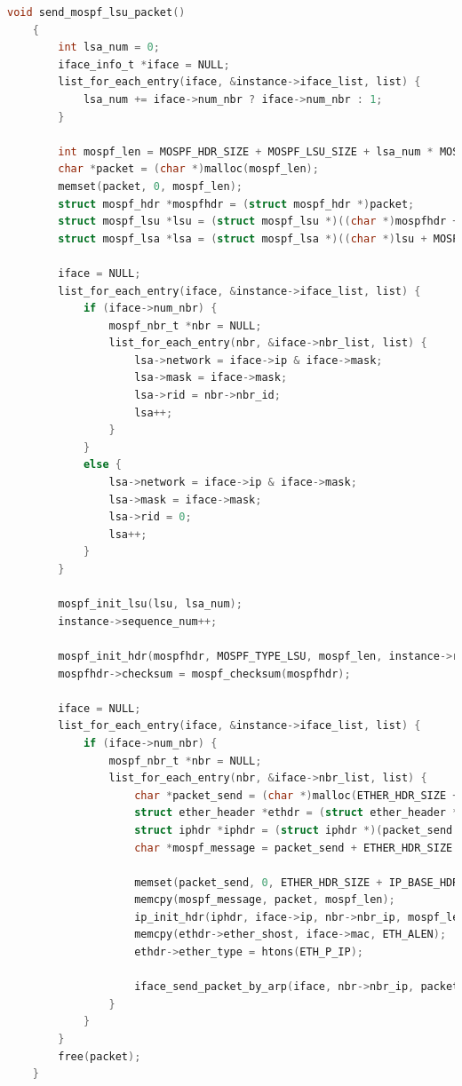 \documentclass[UTF8]{report}
\begin{document}
\begin{lstlisting}[language=C]
    void send_mospf_lsu_packet()
    {
        int lsa_num = 0;
        iface_info_t *iface = NULL;
        list_for_each_entry(iface, &instance->iface_list, list) {
            lsa_num += iface->num_nbr ? iface->num_nbr : 1;
        }
    
        int mospf_len = MOSPF_HDR_SIZE + MOSPF_LSU_SIZE + lsa_num * MOSPF_LSA_SIZE;
        char *packet = (char *)malloc(mospf_len);
        memset(packet, 0, mospf_len);
        struct mospf_hdr *mospfhdr = (struct mospf_hdr *)packet;
        struct mospf_lsu *lsu = (struct mospf_lsu *)((char *)mospfhdr + MOSPF_HDR_SIZE);
        struct mospf_lsa *lsa = (struct mospf_lsa *)((char *)lsu + MOSPF_LSU_SIZE);
    
        iface = NULL;
        list_for_each_entry(iface, &instance->iface_list, list) {
            if (iface->num_nbr) {
                mospf_nbr_t *nbr = NULL;
                list_for_each_entry(nbr, &iface->nbr_list, list) {
                    lsa->network = iface->ip & iface->mask;
                    lsa->mask = iface->mask;
                    lsa->rid = nbr->nbr_id;
                    lsa++;
                }
            }
            else {
                lsa->network = iface->ip & iface->mask;
                lsa->mask = iface->mask;
                lsa->rid = 0;
                lsa++;
            }
        }
    
        mospf_init_lsu(lsu, lsa_num);
        instance->sequence_num++;
    
        mospf_init_hdr(mospfhdr, MOSPF_TYPE_LSU, mospf_len, instance->router_id, instance->area_id);
        mospfhdr->checksum = mospf_checksum(mospfhdr);
    
        iface = NULL;
        list_for_each_entry(iface, &instance->iface_list, list) {
            if (iface->num_nbr) {
                mospf_nbr_t *nbr = NULL;
                list_for_each_entry(nbr, &iface->nbr_list, list) {
                    char *packet_send = (char *)malloc(ETHER_HDR_SIZE + IP_BASE_HDR_SIZE + mospf_len);
                    struct ether_header *ethdr = (struct ether_header *)packet_send;
                    struct iphdr *iphdr = (struct iphdr *)(packet_send + ETHER_HDR_SIZE);
                    char *mospf_message = packet_send + ETHER_HDR_SIZE + IP_BASE_HDR_SIZE;
    
                    memset(packet_send, 0, ETHER_HDR_SIZE + IP_BASE_HDR_SIZE + mospf_len);
                    memcpy(mospf_message, packet, mospf_len);
                    ip_init_hdr(iphdr, iface->ip, nbr->nbr_ip, mospf_len + IP_BASE_HDR_SIZE, IPPROTO_MOSPF);
                    memcpy(ethdr->ether_shost, iface->mac, ETH_ALEN);
                    ethdr->ether_type = htons(ETH_P_IP);
    
                    iface_send_packet_by_arp(iface, nbr->nbr_ip, packet_send, ETHER_HDR_SIZE + IP_BASE_HDR_SIZE + mospf_len);
                }
            }
        }
        free(packet);
    }    
\end{lstlisting}
\end{document}
